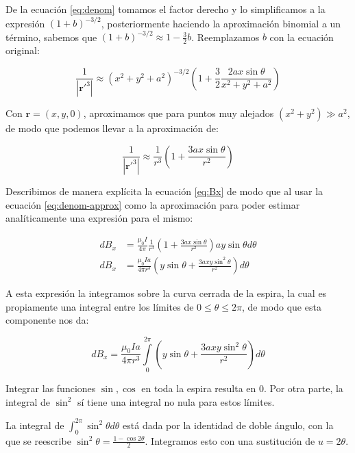 \documentclass{article}
\begin{document}
De la ecuación \ref{eq:denom} tomamos el factor derecho y lo simplificamos a la expresión \( (1 + b)^{-3/2} \), posteriormente haciendo
la aproximación binomial a un término, sabemos que \( (1+b)^{-3/2} \approx 1 - \frac{3}{2} b \). Reemplazamos \(b\) con la ecuación
original:

\[
	\frac{1}{| \mathbf{r}'^3 |} \approx (x^2 + y^2 + a^2)^{-3/2} \left( 1 + \frac{3}{2} \frac{2 a x \sin \theta}{x^2 + y^2 + a^2} \right)
\]

Con \(\mathbf{r} = (x,y,0)\), aproximamos que para puntos muy alejados \( (x^2 + y^2) \gg a^2 \), de modo que podemos llevar a la
aproximación de:

\begin{equation} \label{eq:denom-approx}
	\frac{1}{| \mathbf{r}'^3 |} \approx \frac{1}{r^3} \left( 1 + \frac{3 a x \sin \theta}{r^2} \right)
\end{equation}

Describimos de manera explícita la ecuación \ref{eq:Bx} de modo que al usar la ecuación \ref{eq:denom-approx} como la aproximación
para poder estimar analíticamente una expresión para el mismo:

\[
	\begin{aligned}
		d B_x & = \frac{\mu_0 I}{4 \pi} \frac{1}{r^3} \left( 1 + \frac{3 a x \sin \theta}{r^2} \right) a y \sin \theta d \theta \\
		d B_x & = \frac{\mu_0 I a}{4 \pi r^3}
		\left( y \sin \theta + \frac{3axy \sin^2 \theta}{r^2} \right) d \theta
	\end{aligned}
\]

A esta expresión la integramos sobre la curva cerrada de la espira, la cual es propiamente una integral entre los límites de
\(0 \leq \theta \leq 2 \pi\), de modo que esta componente nos da:

\begin{equation}
	d B_x = \frac{\mu_0 I a}{4 \pi r^3} \int\limits_{0}^{2 \pi}
	\left( y \sin \theta + \frac{3axy \sin^2 \theta}{r^2} \right) d \theta
\end{equation}

Integrar las funciones \(\sin, \cos\) en toda la espira resulta en 0. Por otra parte, la integral de \(\sin^2\) sí tiene una
integral no nula para estos límites.

La integral de \( \int_{0}^{2 \pi} \sin ^2 \theta d \theta \) está dada por la identidad de doble ángulo, con la que
se reescribe \(\sin^2 \theta = \frac{ 1 - \cos 2\theta }{2}\). Integramos esto con una sustitución de \(u = 2 \theta\).
\end{document}
